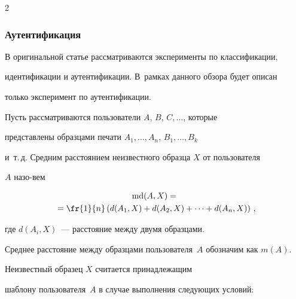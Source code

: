 \begin{multicols}{2}
\begin{table}[b]
\end{table}



\subsubsection{Аутентификация}



В оригинальной статье рассматриваются эксперименты по классификации,

идентификации и аутентификации. В~рамках данного обзора будет описан

только эксперимент по аутентификации.






Пусть рассматриваются пользователи $A$, $B$, $C, \ldots$, которые

представлены образцами печати $A_1, \ldots, A_n$, $B_1, \ldots, B_k$

и~т.\,д. Средним расстоянием неизвестного образца $X$ от пользователя

$A$ назо-\linebreak вем

\begin{multline*}

\mathrm{md}(A, X) ={}\\

{}= \fr{1}{n} \left(d(A_1, X) + d(A_2, X) + \cdots + d(A_n, X)\right)\,,

\end{multline*}

где $d(A_i, X)$~--- расстояние между двумя образцами.



Среднее расстояние между образцами пользователя~$A$ обозначим как $m(A)$.



Неизвестный образец $X$ считается принадлежащим 

шаблону пользователя~$A$ в случае выполнения следующих условий:

\end{multicols}
